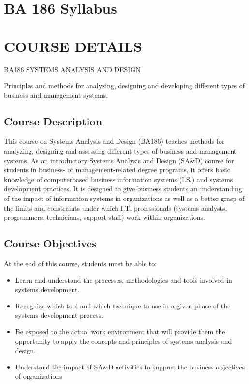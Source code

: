 \hypertarget{ba-186-syllabus}{%
\section{BA 186 Syllabus}\label{ba-186-syllabus}}

\hypertarget{course-details}{%
\section{COURSE DETAILS}\label{course-details}}

BA186 SYSTEMS ANALYSIS AND DESIGN

Principles and methods for analyzing, designing and developing different
types of business and management systems.

\hypertarget{course-description}{%
\subsection{Course Description}\label{course-description}}

This course on Systems Analysis and Design (BA186) teaches methods for
analyzing, designing and assessing different types of business and
management systems. As an introductory Systems Analysis and Design
(SA\&D) course for students in business- or management-related degree
programs, it offers basic knowledge of computerbased business
information systems (I.S.) and systems development practices. It is
designed to give business students an understanding of the impact of
information systems in organizations as well as a better grasp of the
limits and constraints under which I.T. professionals (systems analysts,
programmers, technicians, support staff) work within organizations.

\hypertarget{course-objectives}{%
\subsection{Course Objectives}\label{course-objectives}}

At the end of this course, students must be able to:

\begin{itemize}
\tightlist
\item
  Learn and understand the processes, methodologies and tools involved
  in systems development.
\item
  Recognize which tool and which technique to use in a given phase of
  the systems development process.
\item
  Be exposed to the actual work environment that will provide them the
  opportunity to apply the concepts and principles of systems analysis
  and design.
\item
  Understand the impact of SA\&D activities to support the business
  objectives of organizations
\end{itemize}

